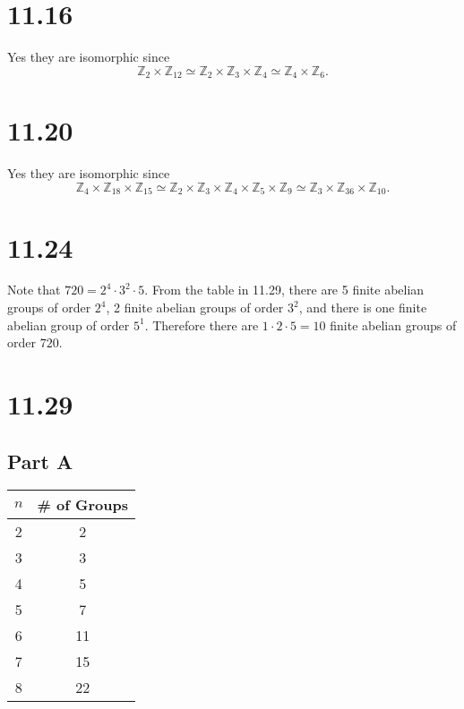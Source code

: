 \documentclass[12pt]{extarticle}
\begin{document}
\section*{11.16}
Yes they are isomorphic since
\[
	\mathbb{Z}_2 \times \mathbb{Z}_{12} \simeq 
	\mathbb{Z}_2 \times \mathbb{Z}_3 \times \mathbb{Z}_4 \simeq
	\mathbb{Z}_4 \times \mathbb{Z}_6
.\]

\section*{11.20}
Yes they are isomorphic since
\[
	\mathbb{Z}_4 \times \mathbb{Z}_{18} \times \mathbb{Z}_{15} \simeq
	\mathbb{Z}_2 \times \mathbb{Z}_3 \times \mathbb{Z}_4 \times \mathbb{Z}_5 \times \mathbb{Z}_9 \simeq
	\mathbb{Z}_3 \times \mathbb{Z}_{36} \times \mathbb{Z}_{10}
.\]

\section*{11.24}
Note that $720 = 2^4 \cdot 3^2 \cdot 5$. From the table in 11.29, there are 5 finite abelian groups of order $2^4$, 2 finite abelian groups of order $3^2$, and there is one finite abelian group of order $5^1$. Therefore there are $1 \cdot 2 \cdot 5 = 10$ finite abelian groups of order $720$.

\section*{11.29}
\subsection*{Part A}

\begin{table}[h!]
	\centering
	\renewcommand\arraystretch{1.5}
	\begin{tabular}{c|c}
		$n$ & \# of Groups \\\hline
		2 & 2   \\\hline
		3 & 3   \\\hline
		4 & 5   \\\hline
		5 & 7   \\\hline
		6 & 11  \\\hline
		7 & 15  \\\hline
		8 & 22  \\\hline
	\end{tabular}
\end{table}
\end{document}
